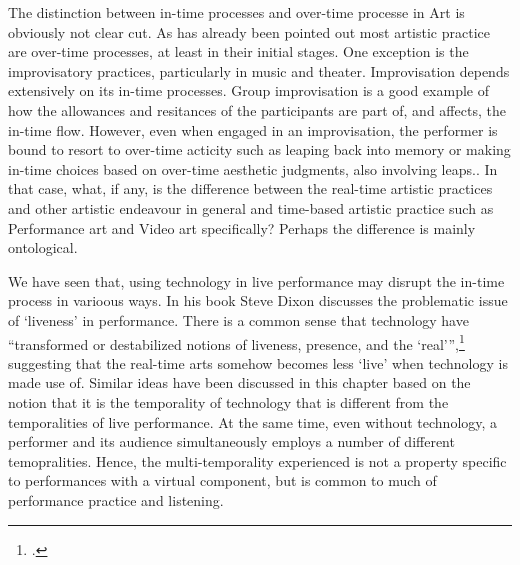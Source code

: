 The distinction between in-time processes and over-time processe in Art is obviously not clear cut. As has already been pointed out most artistic practice are over-time processes, at least in their initial stages. One exception is the improvisatory practices, particularly in music and theater. Improvisation depends extensively on its in-time processes. Group improvisation is a good example of how the allowances and resitances of the participants are part of, and affects, the in-time flow. However, even when engaged in an improvisation, the performer is bound to resort to over-time acticity such as leaping back into memory or making in-time choices based on over-time aesthetic judgments, also involving leaps.. In that case, what, if any, is the difference between the real-time artistic practices and other artistic endeavour in general and time-based artistic practice such as Performance art and Video art specifically? Perhaps the difference is mainly ontological.

We have seen that, using technology in live performance may disrupt the in-time process in varioous ways. In his book  Steve Dixon discusses the problematic issue of `liveness' in performance. There is a common sense that technology have ``transformed or destabilized notions of liveness, presence, and the `real''',\footcite[127]{dixon07} suggesting that the real-time arts somehow becomes less `live' when technology is made use of. Similar ideas have been discussed in this chapter based on the notion that it is the temporality of technology that is different from the temporalities of live performance. At the same time, even without technology, a performer and its audience simultaneously employs a number of different temopralities. Hence, the multi-temporality experienced is not a property specific to performances with a virtual component, but is common to much of performance practice and listening.

